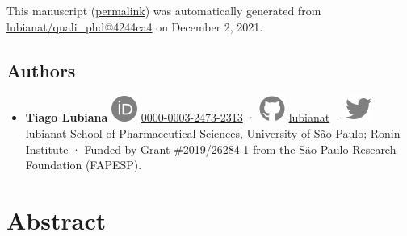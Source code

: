 This manuscript
(\href{https://lubianat.github.io/quali_phd/v/4244ca4800e49e86661876a45daa4ad73dc0ca6e/}{permalink})
was automatically generated
from \href{https://github.com/lubianat/quali_phd/tree/4244ca4800e49e86661876a45daa4ad73dc0ca6e}{lubianat/quali\_phd@4244ca4}
on December 2, 2021.

\hypertarget{authors}{%
\subsection{Authors}\label{authors}}

\begin{itemize}
\tightlist
\item
  \textbf{Tiago Lubiana}
  \includegraphics{images/orcid.svg}
  \href{https://orcid.org/0000-0003-2473-2313}{0000-0003-2473-2313}
  · \includegraphics{images/github.svg}
  \href{https://github.com/lubianat}{lubianat}
  · \includegraphics{images/twitter.svg}
  \href{https://twitter.com/lubianat}{lubianat}
  School of Pharmaceutical Sciences, University of São Paulo; Ronin Institute
  · Funded by Grant \#2019/26284-1 from the São Paulo Research Foundation (FAPESP).
\end{itemize}

\hypertarget{abstract}{%
\section{Abstract}\label{abstract}}

